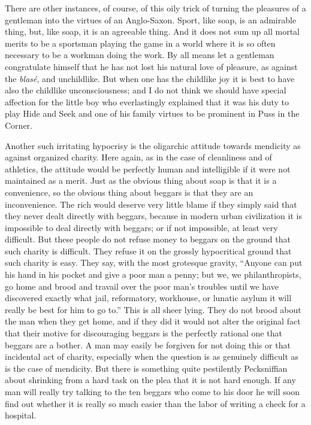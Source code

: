 \documentclass{book}
\begin{document}
There are other instances, of course, of this oily trick of turning the pleasures of a gentleman into the virtues of an Anglo-Saxon. Sport, like soap, is an admirable thing, but, like soap, it is an agreeable thing. And it does not sum up all mortal merits to be a sportsman playing the game in a world where it is so often necessary to be a workman doing the work. By all means let a gentleman congratulate himself that he has not lost his natural love of pleasure, as against the \emph{blasé}, and unchildlike. But when one has the childlike joy it is best to have also the childlike unconsciousness; and I do not think we should have special affection for the little boy who everlastingly explained that it was his duty to play Hide and Seek and one of his family virtues to be prominent in Puss in the Corner.

Another such irritating hypocrisy is the oligarchic attitude towards mendicity as against organized charity. Here again, as in the case of cleanliness and of athletics, the attitude would be perfectly human and intelligible if it were not maintained as a merit. Just as the obvious thing about soap is that it is a convenience, so the obvious thing about beggars is that they are an inconvenience. The rich would deserve very little blame if they simply said that they never dealt directly with beggars, because in modern urban civilization it is impossible to deal directly with beggars; or if not impossible, at least very difficult. But these people do not refuse money to beggars on the ground that such charity is difficult. They refuse it on the grossly hypocritical ground that such charity is easy. They say, with the most grotesque gravity, “Anyone can put his hand in his pocket and give a poor man a penny; but we, we philanthropists, go home and brood and travail over the poor man’s troubles until we have discovered exactly what jail, reformatory, workhouse, or lunatic asylum it will really be best for him to go to.” This is all sheer lying. They do not brood about the man when they get home, and if they did it would not alter the original fact that their motive for discouraging beggars is the perfectly rational one that beggars are a bother. A man may easily be forgiven for not doing this or that incidental act of charity, especially when the question is as genuinely difficult as is the case of mendicity. But there is something quite pestilently Pecksniffian about shrinking from a hard task on the plea that it is not hard enough. If any man will really try talking to the ten beggars who come to his door he will soon find out whether it is really so much easier than the labor of writing a check for a hospital.
\end{document}
